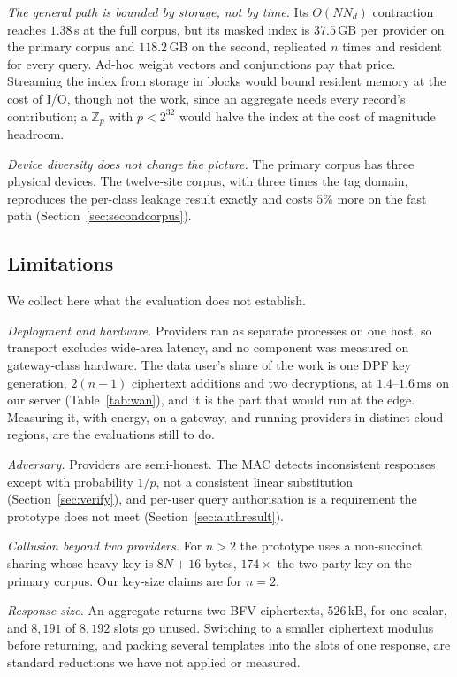 \documentclass[a4paper,fleqn]{cas-dc}
\begin{document}
\emph{The general path is bounded by storage, not by time.} Its
$\Theta(N N_d)$ contraction reaches $1.38$\,s at the full corpus, but its
masked index is $37.5$\,GB per provider on the primary corpus and $118.2$\,GB
on the second, replicated $n$ times and resident for every query. Ad-hoc
weight vectors and conjunctions pay that price. Streaming the index from
storage in blocks would bound resident memory at the cost of I/O, though not
the work, since an aggregate needs every record's contribution; a
$\mathbb{Z}_p$ with $p<2^{32}$ would halve the index at the cost of magnitude
headroom.

\emph{Device diversity does not change the picture.} The primary corpus has
three physical devices. The twelve-site corpus, with three times the tag
domain, reproduces the per-class leakage result exactly and costs $5\%$ more
on the fast path (Section~\ref{sec:secondcorpus}).

\subsection{Limitations}
\label{sec:limits}
We collect here what the evaluation does not establish.

\emph{Deployment and hardware.} Providers ran as separate processes on one
host, so transport excludes wide-area latency, and no component was measured
on gateway-class hardware. The data user's share of the work is one DPF key
generation, $2(n-1)$ ciphertext additions and two decryptions, at
$1.4$--$1.6$\,ms on our server (Table~\ref{tab:wan}), and it is the part that
would run at the edge. Measuring it, with energy, on a gateway, and running
providers in distinct cloud regions, are the evaluations still to do.

\emph{Adversary.} Providers are semi-honest. The MAC detects inconsistent
responses except with probability $1/p$, not a consistent linear substitution
(Section~\ref{sec:verify}), and per-user query authorisation is a requirement
the prototype does not meet (Section~\ref{sec:authresult}).

\emph{Collusion beyond two providers.} For $n>2$ the prototype uses a
non-succinct sharing whose heavy key is $8N+16$ bytes, $174\times$ the
two-party key on the primary corpus. Our key-size claims are for $n=2$.

\emph{Response size.} An aggregate returns two BFV ciphertexts, $526$\,kB, for
one scalar, and $8{,}191$ of $8{,}192$ slots go unused. Switching to a smaller
ciphertext modulus before returning, and packing several templates into the
slots of one response, are standard reductions we have not applied or
measured.
\end{document}

